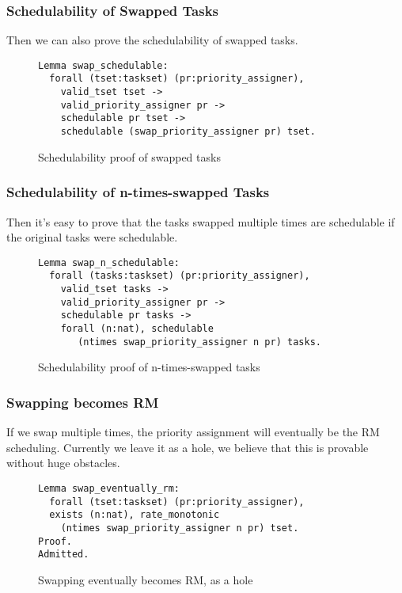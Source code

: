 \documentclass[nocopyrightspace]{sigplanconf}
\begin{document}
\subsubsection{Schedulability of Swapped Tasks}
Then we can also prove the schedulability of swapped tasks.

\begin{figure}[H]
\begin{verbatim}
Lemma swap_schedulable:
  forall (tset:taskset) (pr:priority_assigner),
    valid_tset tset ->
    valid_priority_assigner pr ->
    schedulable pr tset ->
    schedulable (swap_priority_assigner pr) tset.
\end{verbatim}
\caption{ Schedulability proof of swapped tasks }\label{fig:swap-proof}
\end{figure}

\subsubsection{Schedulability of n-times-swapped Tasks}
Then it's easy to prove that the tasks swapped multiple times are schedulable if the original tasks were schedulable.

\begin{figure}[H]
\begin{verbatim}
Lemma swap_n_schedulable:
  forall (tasks:taskset) (pr:priority_assigner),
    valid_tset tasks ->
    valid_priority_assigner pr ->
    schedulable pr tasks ->
    forall (n:nat), schedulable
       (ntimes swap_priority_assigner n pr) tasks.
\end{verbatim}
\caption{ Schedulability proof of n-times-swapped tasks }\label{fig:n-swap-proof}
\end{figure}

\subsubsection{Swapping becomes RM}
If we swap multiple times, the priority assignment will eventually be the RM scheduling. Currently we
leave it as a hole, we believe that this is provable without huge obstacles.

\begin{figure}[H]
\begin{verbatim}
Lemma swap_eventually_rm:
  forall (tset:taskset) (pr:priority_assigner),
  exists (n:nat), rate_monotonic
    (ntimes swap_priority_assigner n pr) tset.
Proof.
Admitted.
\end{verbatim}
\caption{ Swapping eventually becomes RM, as a hole }\label{fig:swap-rm}
\end{figure}
\end{document}
